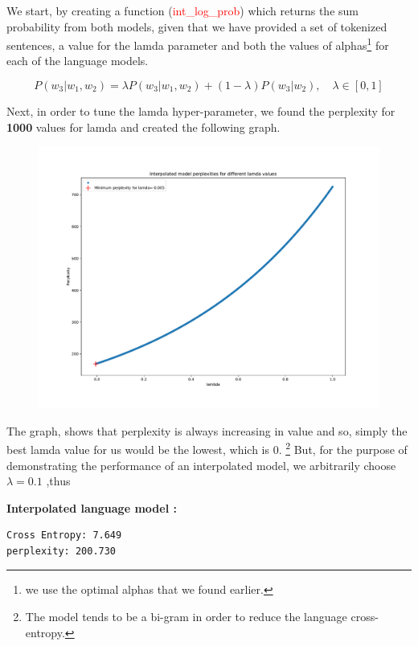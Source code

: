 \documentclass[11pt]{article}
\begin{document}
We start, by creating a function (\textcolor{red}{int\_log\_prob}) which returns the sum probability from both models, given that we have provided a set of tokenized sentences, a value for the lamda parameter and both the values of alphas\footnote{we use the optimal alphas that we found earlier.} for each of the language models.


\begin{equation*}
P(w_3 | w_1, w_2) = \lambda P(w_3 | w_1, w_2) + (1-\lambda) P(w_3 |w_2), \quad \lambda \in [0,1]
\end{equation*}

\newpage
Next, in order to tune the lamda hyper-parameter, we found the perplexity for \textbf{1000} values for lamda and created the following graph.
\begin{figure}[!h]
\includegraphics[width=\columnwidth]{Lambda_Tuning.pdf}
\end{figure}

The graph, shows that perplexity is always increasing in value and so, simply the best lamda value for us would be the lowest, which is 0.
\footnote{The model tends to be a bi-gram in order to reduce the language cross-entropy.} 
But, for the purpose of demonstrating the performance of an interpolated model, we arbitrarily choose $\lambda = 0.1$ ,thus

\bigskip
\textbf{Interpolated language model :}
\begin{verbatim}
Cross Entropy: 7.649
perplexity: 200.730
\end{verbatim}
\end{document}
